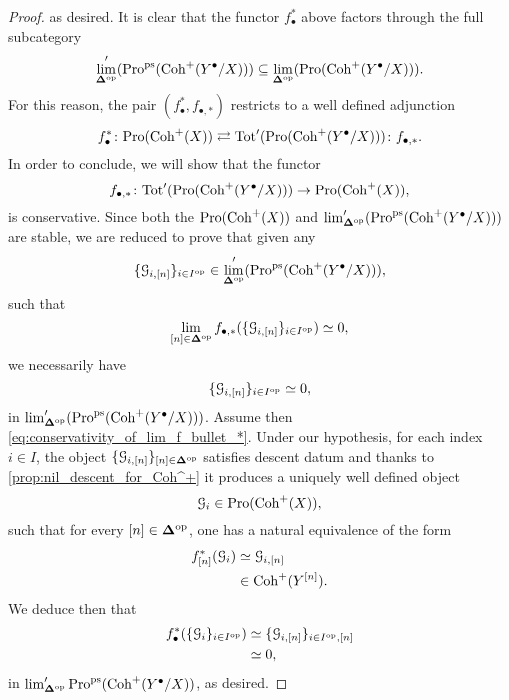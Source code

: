 \documentclass[10pt,a4paper,reqno]{amsart} %
\theoremstyle{plain}
\theoremstyle{definition}
\theoremstyle{remark}
\numberwithin{equation}{section}
\begin{document}
\begin{proof}
    as desired. 
    It is clear that the functor $f_{\bullet
    }^*$ above factors through the full subcategory
        \[
            \lim_{\bm{\Delta} ^\mathrm{op}}'(\mathrm{Pro}^\mathrm{ps}( \mathrm{Coh}^+(Y^\bullet / X)))  \subseteq \lim_{\bm{\Delta} ^\mathrm{op}}(\mathrm{Pro}(\mathrm{Coh}^+(Y^\bullet/X))).
        \]
    For this reason, the pair $(f_\bullet^*, f_{\bullet, *})$ restricts to a well defined adjunction
        \[
            f^*_{\bullet} \colon \mathrm{Pro}(\mathrm{Coh}^+(X))  \rightleftarrows  \mathrm{Tot}'(\mathrm{Pro}(\mathrm{Coh}^+(Y^\bullet/ X))) \colon f_{\bullet, *}.  
        \]
    In order to conclude, we will show that the functor
        \[
            f_{\bullet, *} \colon  \mathrm{Tot}'(\mathrm{Pro}(\mathrm{Coh}^+(Y^\bullet/X))) \to \mathrm{Pro}(\mathrm{Coh}^+(X)) ,  
        \]
    is conservative. Since both the \infcats $\mathrm{Pro}(\mathrm{Coh}^+(X))$ and $\lim_{\bm{\Delta} ^\mathrm{op}}'(\mathrm{Pro}^\mathrm{ps}(\mathrm{Coh}^+(Y^\bullet/X)))$ are stable, we are reduced to prove that given any
        \[
            \{ \mathcal G_{i, [n]} \}_{i \in I^\mathrm{op}} \in \lim_{\bm{\Delta} ^\mathrm{op}}'(\mathrm{Pro}^\mathrm{ps}(\mathrm{Coh}^+(Y^\bullet/X))),  
        \]
    such that 
        \begin{equation} \label{eq:conservativity_of_lim_f_bullet_*}
            \lim_{[n] \in \bm{\Delta} ^\mathrm{op}} f_{\bullet, *}( \{ \mathcal G_{i, [n]} \}_{i \in I^\mathrm{op}})  \simeq 0,
        \end{equation}
    we necessarily have
        \[
            \{ \mathcal G_{i, [n]} \}_{i \in I^\mathrm{op}} \simeq 0  ,
        \]
    in $\lim_{\bm{\Delta} ^\mathrm{op}}'(\mathrm{Pro}^\mathrm{ps}(\mathrm{Coh}^+(Y^\bullet / X)))$.
    Assume then \eqref{eq:conservativity_of_lim_f_bullet_*}. Under our hypothesis, for each index $i \in I$, the object
    $\{ \mathcal G_{i, [n]} \}_{ [n] \in \bm{\Delta} ^\mathrm{op}}$ satisfies descent datum and thanks to \cref{prop:nil_descent_for_Coh^+} it produces a uniquely well defined object
        \[
            \mathcal G_i \in \mathrm{Pro}(\mathrm{Coh}^+(X)),  
        \]
    such that for every $[n] \in \bm{\Delta} ^\mathrm{op}$, one has a natural equivalence of the form
        \begin{align*}
            f_{[n]}^* (\mathcal G_i) & \simeq \mathcal G_{i , [n]} \\
                              & \in \mathrm{Coh}^+(Y^{[n]}).
        \end{align*}
    We deduce then that  
        \begin{align*}
            f^*_{\bullet}(\{ \mathcal G_i \}_{i \in I^\mathrm{op}}) & \simeq \{\mathcal G_{i, [n]} \}_{i \in I^\mathrm{op}, [n]} \\
                                                    & \simeq 0,  
        \end{align*}
    in $\lim'_{\bm{\Delta} ^\mathrm{op}} \mathrm{Pro}^\mathrm{ps}(\mathrm{Coh}^+(Y^\bullet/ X))$, as desired.
\end{proof}
\end{document}
